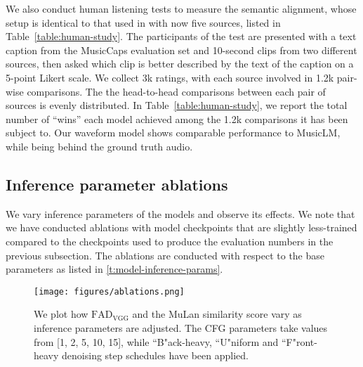 We also conduct human listening tests to measure the semantic alignment, whose setup is identical to that used in \cite{musiclm2023} with now five sources, listed in Table~\ref{table:human-study}. The participants of the test are presented with a text caption from the MusicCaps evaluation set and 10-second clips from two different sources, then asked which clip is better described by the text of the caption on a 5-point Likert scale. We collect 3k ratings, with each source involved in 1.2k pair-wise comparisons. The the head-to-head comparisons between each pair of sources is evenly distributed.
In Table~\ref{table:human-study}, we report the total number of ``wins'' each model achieved among the 1.2k comparisons it has been subject to. Our waveform model shows comparable performance to MusicLM, while being behind the ground truth audio.
\begin{table}[t!]
\caption{The number of wins in pair-wise comparisons of the human listening study. Higher indicates better semantic alignment.}
  \label{table:human-study}
  \vskip 0.05in
  \centering
\vskip-0.15in
\end{table}

\subsection{Inference parameter ablations}

We vary inference parameters of the models and observe its effects. We note that we have conducted ablations with model checkpoints that are slightly less-trained compared to the checkpoints used to produce the evaluation numbers in the previous subsection. The ablations are conducted with respect to the base parameters as listed in \cref{t:model-inference-params}.

\begin{figure}[ht]
\vskip 0.05in
\begin{center}
\centerline{\texttt{[image: figures/ablations.png]}}
\vskip -0.05in
\caption{We plot how $\text{FAD}_\text{VGG}$ and the MuLan similarity score vary as inference parameters are adjusted. The CFG parameters take values from [1, 2, 5, 10, 15], while ``B"ack-heavy, ``U"niform and ``F"ront-heavy denoising step schedules have been applied.}
\label{f:ablations}
\end{center}
\vskip -0.25in
\end{figure}

